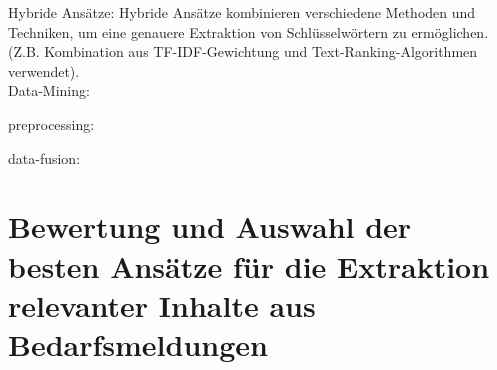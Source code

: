 Hybride Ansätze: Hybride Ansätze kombinieren verschiedene Methoden und Techniken, um eine genauere Extraktion von Schlüsselwörtern zu ermöglichen. (Z.B. Kombination aus TF-IDF-Gewichtung und Text-Ranking-Algorithmen verwendet).\cite{darmawan2015hybrid} \\

Data-Mining: \cite{jun2001review}\cite{jain2013data}

preprocessing: \cite{garcia2016big}

data-fusion: \cite{famili1997data} \cite{frank2005comparing} \cite{bohne2013data}

\section{Bewertung und Auswahl der besten Ansätze für die Extraktion relevanter Inhalte aus Bedarfsmeldungen}

\newpage